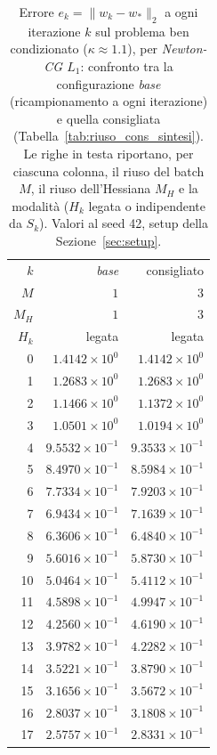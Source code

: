 \begin{table}[H]
\centering
\footnotesize
\renewcommand{\arraystretch}{0.85}
\setlength{\tabcolsep}{8pt}
\caption{Errore $e_k=\|w_k-w_*\|_2$ a ogni iterazione $k$ sul problema ben condizionato ($\kappa\approx 1.1$), per \emph{Newton-CG $L_1$}: confronto tra la configurazione \emph{base} (ricampionamento a ogni iterazione) e quella consigliata (Tabella~\ref{tab:riuso_cons_sintesi}). Le righe in testa riportano, per ciascuna colonna, il riuso del batch $M$, il riuso dell'Hessiana $M_H$ e la modalità ($H_k$ legata o indipendente da $S_k$). Valori al seed 42, setup della Sezione~\ref{sec:setup}.}
\label{tab:riuso_cons_bencond_nl1}
\begin{tabular}{@{}rrr@{}}
\toprule
$k$ & \emph{base} & consigliato\\
$M$ & $1$ & $3$\\
$M_H$ & $1$ & $3$\\
$H_k$ & legata & legata\\
\midrule
0 & $1.4142\times10^{0}$ & $1.4142\times10^{0}$\\
1 & $1.2683\times10^{0}$ & $1.2683\times10^{0}$\\
2 & $1.1466\times10^{0}$ & $1.1372\times10^{0}$\\
3 & $1.0501\times10^{0}$ & $1.0194\times10^{0}$\\
4 & $9.5532\times10^{-1}$ & $9.3533\times10^{-1}$\\
5 & $8.4970\times10^{-1}$ & $8.5984\times10^{-1}$\\
6 & $7.7334\times10^{-1}$ & $7.9203\times10^{-1}$\\
7 & $6.9434\times10^{-1}$ & $7.1639\times10^{-1}$\\
8 & $6.3606\times10^{-1}$ & $6.4840\times10^{-1}$\\
9 & $5.6016\times10^{-1}$ & $5.8730\times10^{-1}$\\
10 & $5.0464\times10^{-1}$ & $5.4112\times10^{-1}$\\
11 & $4.5898\times10^{-1}$ & $4.9947\times10^{-1}$\\
12 & $4.2560\times10^{-1}$ & $4.6190\times10^{-1}$\\
13 & $3.9782\times10^{-1}$ & $4.2282\times10^{-1}$\\
14 & $3.5221\times10^{-1}$ & $3.8790\times10^{-1}$\\
15 & $3.1656\times10^{-1}$ & $3.5672\times10^{-1}$\\
16 & $2.8037\times10^{-1}$ & $3.1808\times10^{-1}$\\
17 & $2.5757\times10^{-1}$ & $2.8331\times10^{-1}$\\

\end{tabular}
\end{table}

